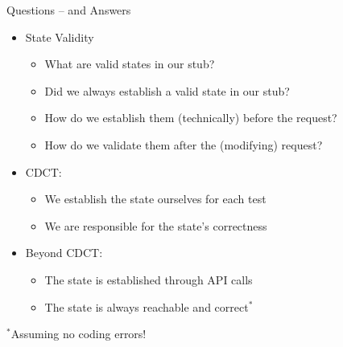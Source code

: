 \begin{frame}[fragile]{Questions -- and Answers}

\begin{itemize}
\item State Validity
\begin{itemize}
\item What are valid states in our stub?
\item Did we always establish a valid state in our stub?
\item How do we establish them (technically) before the request?
\item How do we validate them after the (modifying) request?
\end{itemize}
\end{itemize}

\onslide<+->
\begin{itemize}[<+->]
\item CDCT:
\begin{itemize}
\item We establish the state ourselves for each test
\item We are responsible for the state's correctness
\end{itemize}
\vspace{.4em}
\item Beyond CDCT:
\begin{itemize}
\item The state is established through API calls
\item The state is always reachable and correct$^{*}$
\end{itemize}
\end{itemize}

\onslide<+->
 $^{*}$Assuming no coding errors!
 
\end{frame}


